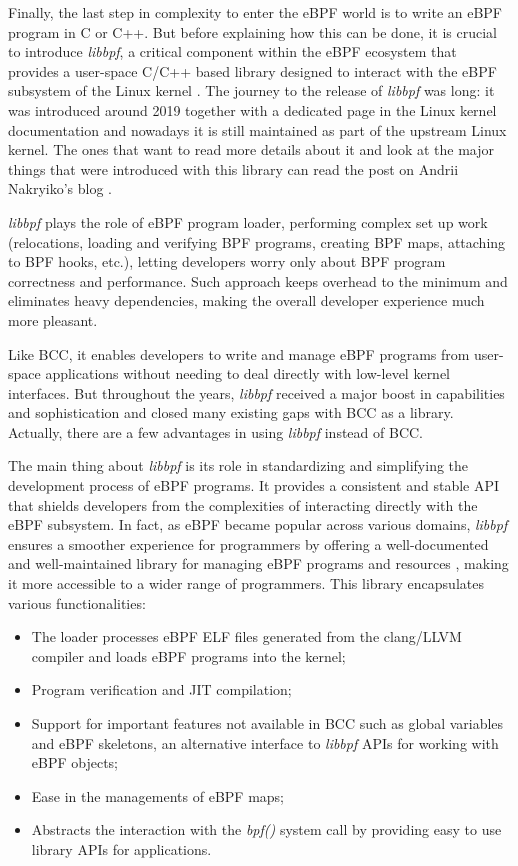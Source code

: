 Finally, the last step in complexity to enter the eBPF world is to write an eBPF program in C or C++.
But before explaining how this can be done, it is crucial to introduce \textit{libbpf},
a critical component within the eBPF ecosystem that provides a user-space C/C++ based library designed to interact with the eBPF subsystem of the Linux kernel \cite{libbpfRepo}. 
The journey to the release of \textit{libbpf} was long: it was introduced around 2019 together with a dedicated page in the Linux kernel documentation \cite{libbpfPageLinuxKernelDOc} and nowadays it is still maintained as part of the upstream Linux kernel.
The ones that want to read more details about it and look at the major things that were introduced with this library can read the post on Andrii Nakryiko's blog \cite{libbpfJourney}.

\textit{libbpf} plays the role of eBPF program loader, performing complex set up work (relocations, loading and verifying BPF programs, creating BPF maps, attaching to BPF hooks, etc.), letting developers worry only about BPF program correctness and performance. 
Such approach keeps overhead to the minimum and eliminates heavy dependencies, making the overall developer experience much more pleasant.

Like BCC, it enables developers to write and manage eBPF programs from user-space applications without needing to deal directly with low-level kernel interfaces.
But throughout the years, \textit{libbpf} received a major boost in capabilities and sophistication and closed many existing gaps with BCC as a library.
Actually, there are a few advantages in using \textit{libbpf} instead of BCC.

The main thing about \textit{libbpf} is its role in standardizing and simplifying the development process of eBPF programs. 
It provides a consistent and stable API that shields developers from the complexities of interacting directly with the eBPF subsystem. 
In fact, as eBPF became popular across various domains, \textit{libbpf} ensures a smoother experience for programmers by offering a well-documented and well-maintained library for managing eBPF programs and resources \cite{libbpfDocumentation}, making it more accessible to a wider range of programmers.
This library encapsulates various functionalities:

\begin{itemize}
	\item The loader processes eBPF ELF files generated from the 
		clang/LLVM compiler and loads eBPF programs into the kernel;
	\item Program verification and JIT compilation;
	\item Support for important features not available in BCC such as global 
		variables and eBPF skeletons, an alternative interface to \textit{libbpf} APIs for working with eBPF objects;
	\item Ease in the managements of eBPF maps;
	\item Abstracts the interaction with the \textit{bpf()} system call by providing 
		easy to use library APIs for applications.
\end{itemize}

